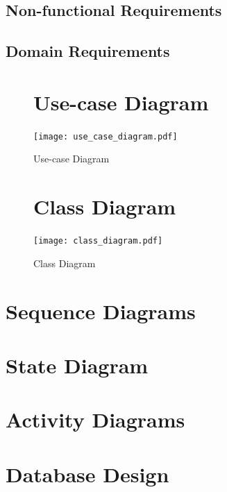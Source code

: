 \documentclass[12pt]{article}
\begin{document}
\subsection{Non-functional Requirements}

\subsection{Domain Requirements}

\begin{figure}[p!]
  \section{Use-case Diagram}
  \centering
  \texttt{[image: use\_case\_diagram.pdf]}
  \caption{Use-case Diagram}
\end{figure}

\clearpage

\begin{figure}[p!]
  \section{Class Diagram}
  \centering
  \texttt{[image: class\_diagram.pdf]}
  \caption{Class Diagram}
\end{figure}

\clearpage

\section{Sequence Diagrams}

\section{State Diagram}

\section{Activity Diagrams}

\section{Database Design}
\end{document}
